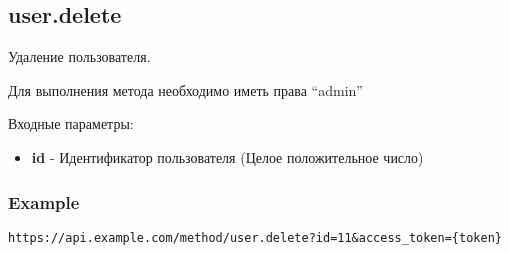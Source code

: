 \subsection{user.delete}
Удаление пользователя. 

Для выполнения метода необходимо иметь права “admin”

Входные параметры:
\begin{itemize}
  \item \textbf{id} - Идентификатор пользователя (Целое положительное число)
\end{itemize}

\subsubsection{Example}
\begin{Verbatim}[frame=single]
https://api.example.com/method/user.delete?id=11&access_token={token}
\end{Verbatim}

